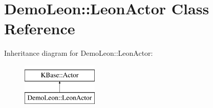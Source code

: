 \hypertarget{class_demo_leon_1_1_leon_actor}{\section{Demo\-Leon\-:\-:Leon\-Actor Class Reference}
\label{class_demo_leon_1_1_leon_actor}
}
Inheritance diagram for Demo\-Leon\-:\-:Leon\-Actor\-:\begin{figure}[H]
\begin{center}
\leavevmode
\includegraphics[height=2.000000cm]{class_demo_leon_1_1_leon_actor}
\end{center}
\end{figure}
